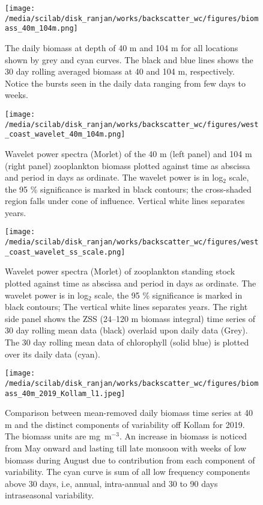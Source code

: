\documentclass{article}
\begin{document}
\begin{figure}[htbp]
	\centering
	\texttt{[image: /media/scilab/disk\_ranjan/works/backscatter\_wc/figures/biomass\_40m\_104m.png]} 
	\captionsetup{justification=justified,font=footnotesize,skip=0.05\baselineskip,width=\textwidth}
	\caption{The daily biomass at depth of 40 m and 104 m for all locations shown by grey and cyan curves. The black and blue lines shows the 30 day rolling averaged biomass at 40 and 104 m, respectively. Notice the bursts seen in the daily data ranging from few days to weeks.}
	\label{fig:compfourty}
\end{figure}

\begin{figure}[htbp]
	\centering
	\texttt{[image: /media/scilab/disk\_ranjan/works/backscatter\_wc/figures/west\_coast\_wavelet\_40m\_104m.png]} 
	\captionsetup{justification=justified,font=footnotesize,skip=0.05\baselineskip,width=\textwidth}
	\caption{Wavelet power spectra (Morlet) of the 40 m (left panel) and 104 m (right panel) zooplankton biomass plotted against time as abscissa and period in days as ordinate. The wavelet power is in log$_2$ scale, the 95 \% significance is marked in black contours; the cross-shaded region falls under cone of influence. Vertical white lines separates years.}
	\label{fig:wave40104}
\end{figure}


\begin{figure}[htbp]
	\centering
	\texttt{[image: /media/scilab/disk\_ranjan/works/backscatter\_wc/figures/west\_coast\_wavelet\_ss\_scale.png]} 
	\captionsetup{justification=justified,font=footnotesize,skip=0.05\baselineskip,width=\textwidth}
	\caption{Wavelet power spectra (Morlet) of zooplankton standing stock plotted against time as abscissa and period in days as ordinate. The wavelet power is in log$_2$ scale, the 95 \% significance is marked in black contours; The vertical white lines separates years. The right side panel shows the ZSS (24--120 m biomass integral) time series of 30 day rolling mean data (black) overlaid upon daily data (Grey). The 30 day rolling mean data of chlorophyll (solid blue) is plotted over its daily data (cyan).}
	\label{fig:wavess}
\end{figure}


\begin{figure}[htbp]
	\centering
	\texttt{[image: /media/scilab/disk\_ranjan/works/backscatter\_wc/figures/biomass\_40m\_2019\_Kollam\_l1.jpeg]} 
	\captionsetup{justification=justified,font=footnotesize,skip=0.05\baselineskip,width=\textwidth}
	\caption{Comparison between mean-removed daily biomass time series at 40 m and the distinct components of variability off Kollam for 2019. The biomass units are mg~m$^{-3}$. An increase in biomass is noticed from May onward and lasting till late monsoon with weeks of low biomass during August due to contribution from each component of variability. The cyan curve is sum of all low frequency components above 30 days, i.e, annual, intra-annual and 30 to 90 days intraseasonal variability.}
	\label{fig:variability}
\end{figure}
\end{document}
